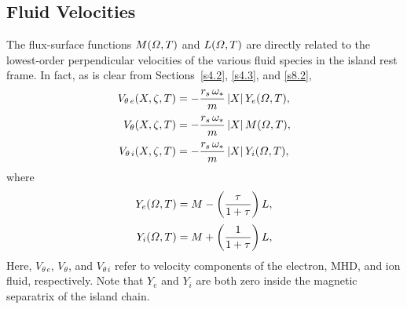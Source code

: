 \documentclass[notitlepage,12pt]{article}
\begin{document}
\subsection{Fluid Velocities}\label{s8.6}
The flux-surface functions $M({\mit\Omega},T)$ and $L({\mit\Omega},T)$ are directly related to the lowest-order perpendicular
velocities of the various fluid species in the island rest frame. In fact, as is clear from Sections~\ref{s4.2}, \ref{s4.3}, and \ref{s8.2}, 
\begin{align}\label{e519a}
V_{\theta\,e}(X,\zeta,T)& = -\frac{r_s\,\omega_\ast}{m}\,|X|\,Y_e({\mit\Omega},T),\\[0.5ex]
V_\theta(X,\zeta,T) &= -\frac{r_s\,\omega_\ast}{m}\,|X|\,M({\mit\Omega},T),\\[0.5ex]
V_{\theta\,i}(X,\zeta,T)& = -\frac{r_s\,\omega_\ast}{m}\,|X|\,Y_i({\mit\Omega},T),\label{e521a}
\end{align}
where
\begin{align}\label{e517}
Y_e({\mit\Omega},T)&= M- \left(\frac{\tau}{1+\tau}\right)L,\\[0.5ex]
Y_i({\mit\Omega},T)&= M+\left(\frac{1}{1+\tau}\right)L,\label{e518}
\end{align}
Here,  $V_{\theta\,e}$, $V_\theta$, and $V_{\theta\,i}$  refer to velocity components of the electron, MHD, and ion 
 fluid, respectively. Note that $Y_e$ and $Y_i$ are both zero inside the magnetic separatrix of the island chain. 
\end{document}
